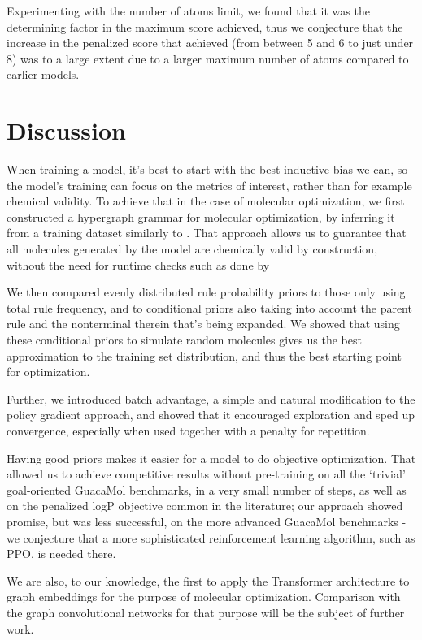 \documentclass{article}
\begin{document}
Experimenting with the number of atoms limit, we found that it was the determining factor in the maximum score achieved, thus we conjecture that the increase in the penalized score that \cite{you2018} achieved (from between 5 and 6 to just under 8) was to a large extent due to a larger maximum number of atoms compared to earlier models.

\section{Discussion}
When training a model, it's best to start with the best inductive bias we can, so the model's training can focus on the metrics of interest, rather than for example chemical validity. To achieve that in the case of molecular optimization, we first constructed a hypergraph grammar for molecular optimization, by inferring it from a training dataset similarly to \cite{kajino2018}. That approach allows us to guarantee that all molecules generated by the model are chemically valid by construction, without the need for runtime checks such as done by \cite{you2018}

We then compared evenly distributed rule probability priors to those only using total rule frequency, and to conditional priors also taking into account the parent rule and the nonterminal therein that's being expanded. We showed that using these conditional priors to simulate random molecules gives us the best approximation to the training set distribution, and thus the best starting point for optimization.

Further, we introduced batch advantage, a simple and natural modification to the policy gradient approach, and showed that it encouraged exploration and sped up convergence, especially when used together with a penalty for repetition.

Having good priors makes it easier for a model to do objective optimization. That allowed us to achieve competitive results without pre-training on all the `trivial' goal-oriented GuacaMol benchmarks, in a very small number of steps, as well as on the penalized logP objective common in the literature;  our approach showed promise, but was less successful, on the more advanced GuacaMol benchmarks - we conjecture that a more sophisticated reinforcement learning algorithm, such as PPO, is needed there.

We are also, to our knowledge, the first to apply the Transformer architecture to graph embeddings for the purpose of molecular optimization. Comparison with the graph convolutional networks for that purpose will be the subject of further work.
\pagebreak

\medskip

\small
 

\end{document}
